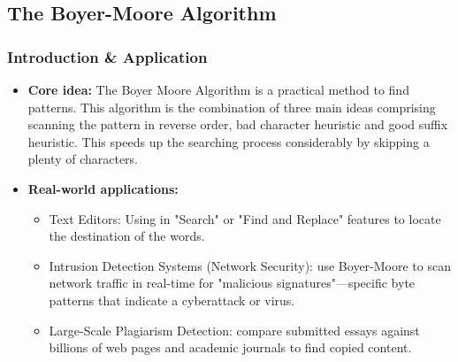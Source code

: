 \subsection[The Boyer-Moore Algorithm]{The Boyer-Moore Algorithm\cite{ElMabrouk1996}}
    \subsubsection{Introduction \& Application}
        \begin{itemize}
            \item \textbf{Core idea:} The Boyer Moore Algorithm is a practical method to find patterns. This algorithm is the combination of three main ideas comprising scanning the pattern in reverse order, bad character heuristic and good suffix heuristic. This speeds up the searching process
             considerably by skipping a plenty of characters. 
            \item \textbf{Real-world applications:}
            \begin{itemize}
                \item Text Editors: Using in "Search" or "Find and Replace" features to locate the destination of the words.
                \item Intrusion Detection Systems (Network Security): use Boyer-Moore to scan network traffic in real-time for "malicious signatures"—specific byte patterns that indicate a cyberattack or virus.
                \item Large-Scale Plagiarism Detection: compare submitted essays against billions of web pages and academic journals to find copied content.
            \end{itemize}
        \end{itemize}

